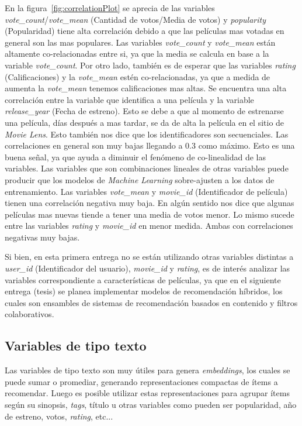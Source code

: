 \documentclass[11pt,a4paper,twoside]{thesis}
\begin{document}
En la figura~\ref{fig:correlationPlot} se aprecia de las variables
\textit{vote\_count}/\textit{vote\_mean} (Cantidad de votos/Media de votos) y
\textit{popularity} (Popularidad) tiene alta correlación debido a que las
películas mas votadas en general son las mas populares. Las variables
\textit{vote\_count} y \textit{vote\_mean} están altamente co-relacionadas
entre si, ya que la media se calcula en base a la variable
\textit{vote\_count}. Por otro lado, también es de esperar que las variables
\textit{rating} (Calificaciones) y la \textit{vote\_mean} estén
co-relacionadas, ya que a medida de aumenta la \textit{vote\_mean} tenemos
calificaciones mas altas. Se encuentra una alta correlación entre la variable
que identifica a una película y la variable \textit{release\_year} (Fecha de
estreno). Esto se debe a que al momento de estrenarse una película, días
después a mas tardar, se da de alta la película en el sitio de \textit{Movie
	Lens}. Esto también nos dice que los identificadores son secuenciales. Las
correlaciones en general son muy bajas llegando a $0.3$ como máximo. Esto es
una buena señal, ya que ayuda a diminuir el fenómeno de co-linealidad de las
variables. Las variables que son combinaciones lineales de otras variables
puede producir que los modelos de \textit{Machine Learning} sobre-ajusten a los
datos de entrenamiento. Las variables \textit{vote\_mean} y \textit{movie\_id}
(Identificador de película) tienen una correlación negativa muy baja. En algún
sentido nos dice que algunas películas mas nuevas tiende a tener una media de
votos menor. Lo mismo sucede entre las variables \textit{rating} y
\textit{movie\_id} en menor medida. Ambas con correlaciones negativas muy
bajas.

Si bien, en esta primera entrega no se están utilizando otras variables
distintas a \textit{user\_id} (Identificador del usuario), \textit{movie\_id} y
\textit{rating}, es de interés analizar las variables correspondiente a
características de películas, ya que en el siguiente entrega (tesis) se planea
implementar modelos de recomendación híbridos, los cuales son ensambles de
sistemas de recomendación basados en contenido y filtros colaborativos.

\subsection{Variables de tipo texto}

Las variables de tipo texto son muy útiles para genera \textit{embeddings}, los
cuales se puede sumar o promediar, generando representaciones compactas de
ítems a recomendar. Luego es posible utilizar estas representaciones para
agrupar ítems según su sinopsis, \textit{tags}, título u otras variables como
pueden ser popularidad, año de estreno, votos, \textit{rating}, etc...
\end{document}
